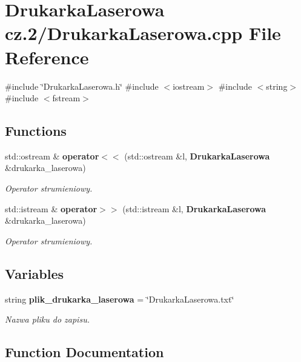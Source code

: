 \section{Drukarka\+Laserowa cz.2/\+Drukarka\+Laserowa.cpp File Reference}
\label{_drukarka_laserowa_8cpp}
{\ttfamily \#include \char`\"{}Drukarka\+Laserowa.\+h\char`\"{}}\newline
{\ttfamily \#include $<$iostream$>$}\newline
{\ttfamily \#include $<$string$>$}\newline
{\ttfamily \#include $<$fstream$>$}\newline
\subsection*{Functions}
\begin{DoxyCompactItemize}
\item 
std\+::ostream \& \textbf{ operator$<$$<$} (std\+::ostream \&l, \textbf{ Drukarka\+Laserowa} \&drukarka\+\_\+laserowa)
\begin{DoxyCompactList}\small\item\em Operator strumieniowy. \end{DoxyCompactList}\item 
std\+::istream \& \textbf{ operator$>$$>$} (std\+::istream \&l, \textbf{ Drukarka\+Laserowa} \&drukarka\+\_\+laserowa)
\begin{DoxyCompactList}\small\item\em Operator strumieniowy. \end{DoxyCompactList}\end{DoxyCompactItemize}
\subsection*{Variables}
\begin{DoxyCompactItemize}
\item 
string \textbf{ plik\+\_\+drukarka\+\_\+laserowa} = \char`\"{}Drukarka\+Laserowa.\+txt\char`\"{}
\begin{DoxyCompactList}\small\item\em Nazwa pliku do zapisu. \end{DoxyCompactList}\end{DoxyCompactItemize}


\subsection{Function Documentation}
\mbox{\label{_drukarka_laserowa_8cpp_a9aeecb5f56f3f86716b4668ba91803b9}} 
